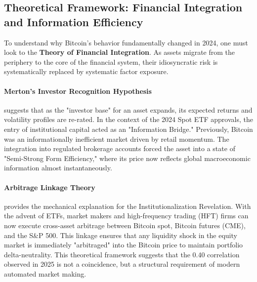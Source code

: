 \documentclass[10pt, conference, compsocconf]{IEEEtran}
\begin{document}

\subsection{Theoretical Framework: Financial Integration and Information Efficiency}

To understand why Bitcoin’s behavior fundamentally changed in 2024, one must look to the \textbf{Theory of Financial Integration}. As assets migrate from the periphery to the core of the financial system, their idiosyncratic risk is systematically replaced by systematic factor exposure.

\paragraph{Merton’s Investor Recognition Hypothesis} suggests that as the "investor base" for an asset expands, its expected returns and volatility profiles are re-rated. In the context of the 2024 Spot ETF approvals, the entry of institutional capital acted as an "Information Bridge." Previously, Bitcoin was an informationally inefficient market driven by retail momentum. The integration into regulated brokerage accounts forced the asset into a state of "Semi-Strong Form Efficiency," where its price now reflects global macroeconomic information almost instantaneously.

\paragraph{Arbitrage Linkage Theory} provides the mechanical explanation for the Institutionalization Revelation. With the advent of ETFs, market makers and high-frequency trading (HFT) firms can now execute cross-asset arbitrage between Bitcoin spot, Bitcoin futures (CME), and the S\&P 500. This linkage ensures that any liquidity shock in the equity market is immediately "arbitraged" into the Bitcoin price to maintain portfolio delta-neutrality. This theoretical framework suggests that the 0.40 correlation observed in 2025 is not a coincidence, but a structural requirement of modern automated market making.

\end{document}
